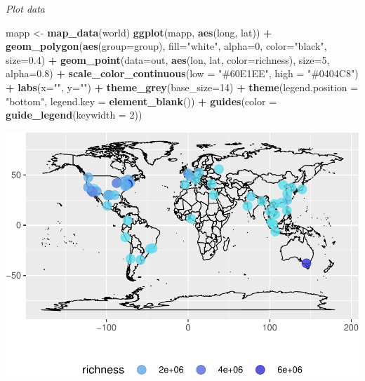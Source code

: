 \documentclass[3p]{elsarticle} %
\makeatletter
\newenvironment{Shaded}{\begin{snugshade}}{\end{snugshade}}
\newcommand{\DataTypeTok}[1]{\textcolor[rgb]{0.13,0.29,0.53}{#1}}
\newcommand{\DecValTok}[1]{\textcolor[rgb]{0.00,0.00,0.81}{#1}}
\newcommand{\FloatTok}[1]{\textcolor[rgb]{0.00,0.00,0.81}{#1}}
\newcommand{\KeywordTok}[1]{\textcolor[rgb]{0.13,0.29,0.53}{\textbf{#1}}}
\newcommand{\NormalTok}[1]{#1}
\newcommand{\OperatorTok}[1]{\textcolor[rgb]{0.81,0.36,0.00}{\textbf{#1}}}
\newcommand{\StringTok}[1]{\textcolor[rgb]{0.31,0.60,0.02}{#1}}
\def\maxwidth{\ifdim\Gin@nat@width>\linewidth\linewidth
\else\Gin@nat@width\fi}
\let\Oldincludegraphics\includegraphics
\renewcommand{\includegraphics}[1]{\Oldincludegraphics[width=\maxwidth]{#1}}
\makeatother
\begin{document}
\emph{Plot data}

\begin{Shaded}
\begin{Highlighting}[]
\NormalTok{mapp <{-}}\StringTok{ }\KeywordTok{map\_data}\NormalTok{(}\StringTok{\textquotesingle{}world\textquotesingle{}}\NormalTok{)}
\KeywordTok{ggplot}\NormalTok{(mapp, }\KeywordTok{aes}\NormalTok{(long, lat)) }\OperatorTok{+}
\StringTok{  }\KeywordTok{geom\_polygon}\NormalTok{(}\KeywordTok{aes}\NormalTok{(}\DataTypeTok{group=}\NormalTok{group), }\DataTypeTok{fill=}\StringTok{"white"}\NormalTok{, }\DataTypeTok{alpha=}\DecValTok{0}\NormalTok{, }\DataTypeTok{color=}\StringTok{"black"}\NormalTok{, }\DataTypeTok{size=}\FloatTok{0.4}\NormalTok{) }\OperatorTok{+}
\StringTok{  }\KeywordTok{geom\_point}\NormalTok{(}\DataTypeTok{data=}\NormalTok{out, }\KeywordTok{aes}\NormalTok{(lon, lat, }\DataTypeTok{color=}\NormalTok{richness), }\DataTypeTok{size=}\DecValTok{5}\NormalTok{, }\DataTypeTok{alpha=}\FloatTok{0.8}\NormalTok{) }\OperatorTok{+}
\StringTok{  }\KeywordTok{scale\_color\_continuous}\NormalTok{(}\DataTypeTok{low =} \StringTok{"\#60E1EE"}\NormalTok{, }\DataTypeTok{high =} \StringTok{"\#0404C8"}\NormalTok{) }\OperatorTok{+}
\StringTok{  }\KeywordTok{labs}\NormalTok{(}\DataTypeTok{x=}\StringTok{""}\NormalTok{, }\DataTypeTok{y=}\StringTok{""}\NormalTok{) }\OperatorTok{+}
\StringTok{  }\KeywordTok{theme\_grey}\NormalTok{(}\DataTypeTok{base\_size=}\DecValTok{14}\NormalTok{) }\OperatorTok{+}
\StringTok{  }\KeywordTok{theme}\NormalTok{(}\DataTypeTok{legend.position =} \StringTok{"bottom"}\NormalTok{, }\DataTypeTok{legend.key =} \KeywordTok{element\_blank}\NormalTok{()) }\OperatorTok{+}
\StringTok{  }\KeywordTok{guides}\NormalTok{(}\DataTypeTok{color =} \KeywordTok{guide\_legend}\NormalTok{(}\DataTypeTok{keywidth =} \DecValTok{2}\NormalTok{))}
\end{Highlighting}
\end{Shaded}

\includegraphics{components/figure/manuscript_mee-unnamed-chunk-62-1.pdf}
\end{document}
